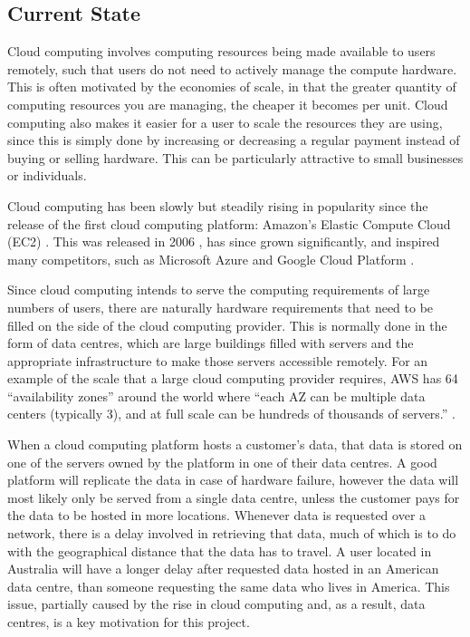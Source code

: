 \subsection{Current State}
\label{current_state}

Cloud computing involves computing resources being made available to users remotely, such that users do not need to actively manage the compute hardware.
This is often motivated by the economies of scale, in that the greater quantity of computing resources you are managing, the cheaper it becomes per unit.
Cloud computing also makes it easier for a user to scale the resources they are using, since this is simply done by increasing or decreasing a regular payment instead of buying or selling hardware. This can be particularly attractive to small businesses or individuals.

Cloud computing has been slowly but steadily rising in popularity since the release of the first cloud computing platform: Amazon's Elastic Compute Cloud (EC2) \cite{ec2}.
This was released in 2006 \cite{announce_ec2}, has since grown significantly, and inspired many competitors, such as Microsoft Azure \cite{azure} and Google Cloud Platform \cite{google_cloud}.

Since cloud computing intends to serve the computing requirements of large numbers of users, there are naturally hardware requirements that need to be filled on the side of the cloud computing provider.
This is normally done in the form of data centres, which are large buildings filled with servers and the appropriate infrastructure to make those servers accessible remotely. For an example of the scale that a large cloud computing provider requires, AWS has 64 ``availability zones'' around the world where ``each AZ can be multiple data centers (typically 3), and at full scale can be hundreds of thousands of servers.'' \cite{aws_infrastructure_blog}.

When a cloud computing platform hosts a customer's data, that data is stored on one of the servers owned by the platform in one of their data centres. A good platform will replicate the data in case of hardware failure, however the data will most likely only be served from a single data centre, unless the customer pays for the data to be hosted in more locations.
Whenever data is requested over a network, there is a delay involved in retrieving that data, much of which is to do with the geographical distance that the data has to travel. A user located in Australia will have a longer delay after requested data hosted in an American data centre, than someone requesting the same data who lives in America.
This issue, partially caused by the rise in cloud computing and, as a result, data centres, is a key motivation for this project.


